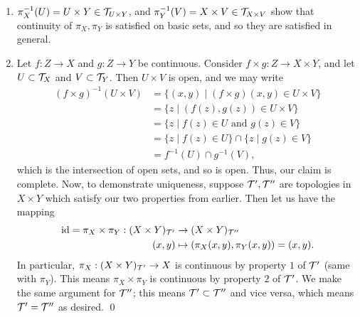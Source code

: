 \begin{enumerate}
    \item $\pi_X^{-1}(U) = U \times Y \in \mathcal T_{U \times Y}$, and $\pi_Y^{-1}(V) = X \times V \in \mathcal T_{X \times V}$ show that continuity of $\pi_X, \pi_Y$ is satisfied on basic sets, and so they are satisfied in general.
    \item Let $f : Z \to X$ and $g : Z \to Y$ be continuous. Consider $f \times g : Z \to X \times Y$, and let $U \subset \mathcal T_X$ and $V \subset \mathcal T_Y$. Then $U \times V$ is open, and we may write
    \begin{align*}
        (f \times g)^{-1}(U \times V) &= \{(x, y) \mid (f \times g)(x, y) \in U \times V\} \\
        &= \{z \mid (f(z), g(z)) \in U \times V\} \\
        &= \{z \mid f(z) \in U \text{ and } g(z) \in V\} \\
        &= \{z \mid f(z) \in U\} \cap \{z \mid g(z) \in V\} \\
        &= f^{-1}(U) \cap g^{-1}(V),
    \end{align*}
    which is the intersection of open sets, and so is open. Thus, our claim is complete. Now, to demonstrate uniqueness, suppose $\mathcal T', \mathcal T''$ are topologies in $X \times Y$ which satisfy our two properties from earlier. Then let us have the mapping
    \begin{align*}
        \mathrm{id} = \pi_X \times \pi_Y : (X \times Y)_{\mathcal T'} &\to (X \times Y)_{\mathcal T''} \\
        (x, y) &\mapsto (\pi_X(x, y), \pi_Y(x, y)) = (x, y).
    \end{align*}
    In particular, $\pi_X : (X \times Y)_{\mathcal T'} \to X$ is continuous by property $1$ of $\mathcal T'$ (same with $\pi_Y$). This means $\pi_X \times \pi_Y$ is continuous by property $2$ of $\mathcal T'$. We make the same argument for $\mathcal T''$; this means $\mathcal T' \subset \mathcal T''$ and vice versa, which means $\mathcal T' = \mathcal T''$ as desired. \qed
\end{enumerate}